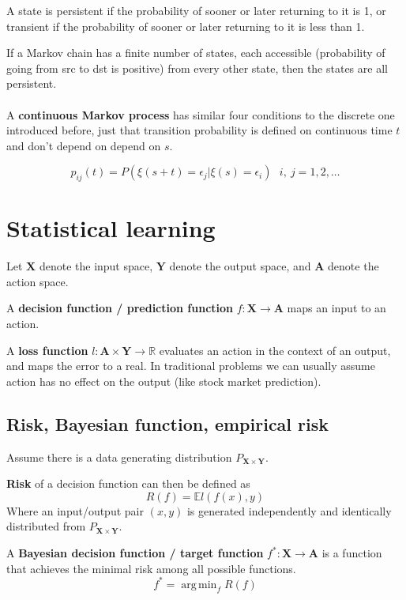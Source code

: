 \documentclass{article}
\DeclareMathOperator*{\argmin}{arg\,min}
\begin{document}
A state is persistent if the probability of sooner or later returning to it is 1, or transient if the probability of sooner or later returning to it is less than 1.

If a Markov chain has a finite number of states, each accessible (probability of going from src to dst is positive) from every other state, then the states are all persistent.
\\
\\
A \textbf{continuous Markov process} has similar four conditions to the discrete one introduced before, just that transition probability is defined on continuous time $t$ and don't depend on depend on $s$.

$$
p_{ij}(t) = P(\xi(s + t) = \epsilon_j | \xi(s) = \epsilon_i) ~ ~ ~ i, ~j = 1, 2, \dots
$$

\section{Statistical learning}

Let $\mathbf{X}$ denote the input space, $\mathbf{Y}$ denote the output space, and $\mathbf{A}$ denote the action space.

A \textbf{decision function / prediction function} $f: \mathbf{X} \to \mathbf{A}$ maps an input to an action.

A \textbf{loss function} $\mathit{l}: \mathbf{A} \times \mathbf{Y} \to \mathbb{R}$ evaluates an action in the context of an output, and maps the error to a real.
In traditional problems we can usually assume action has no effect on the output (like stock market prediction).

\subsection{Risk, Bayesian function, empirical risk}

Assume there is a data generating distribution $P_{\mathbf{X} \times \mathbf{Y}}$.

\textbf{Risk} of a decision function can then be defined as
$$
R(f) = \mathbb{E}\mathit{l}(f(x), y)
$$
Where an input/output pair $(x, y)$ is generated independently and identically distributed from $P_{\mathbf{X} \times \mathbf{Y}}$.

A \textbf{Bayesian decision function / target function} $f^* : \mathbf{X} \to \mathbf{A}$ is a function that achieves the minimal risk among all possible functions.
$$
f^* = \argmin_{f}{R(f)}
$$
\end{document}
